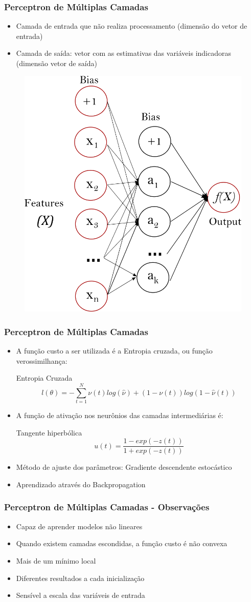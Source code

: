 \documentclass{beamer}
\begin{document}
\begin{frame}
\frametitle{Perceptron de Múltiplas Camadas}
\begin{itemize}
  \item Camada de entrada que não realiza processamento (dimensão do vetor de entrada)
  \item Camada de saída: vetor com as estimativas das variáveis indicadoras (dimensão vetor de saída)
\end{itemize}
\begin{figure}[H]
\centering
  \includegraphics[width=0.43\linewidth]{../img/multilayerperceptron_network.png}
  \label{fig:percep}
\end{figure}%
\end{frame}

\begin{frame}
\frametitle{Perceptron de Múltiplas Camadas}
\begin{itemize}
\item A função custo a ser utilizada é a Entropia cruzada, ou função verossimilhança:
\begin{block}{Entropia Cruzada}
\[ l(\theta) = -\sum_{t=1}^N \nu(t)log(\hat{\nu}) + (1-\nu(t)) log(1-\hat{\nu}(t)) \]
\end{block}
\item A função de ativação nos neurônios das camadas intermediárias é:
\begin{block}{Tangente hiperbólica}
\[ u(t) = \frac{1- exp(-z(t))}{1+exp(-z(t))}\]
\end{block}
\item Método de ajuste dos parâmetros: Gradiente descendente estocástico
\item Aprendizado através do Backpropagation
\end{itemize}
\end{frame}


\begin{frame}
\frametitle{Perceptron de Múltiplas Camadas - Observações}
\begin{itemize}
  \item Capaz de aprender modelos não lineares
  \item Quando existem camadas escondidas, a função custo é não convexa 
  \item Mais de um mínimo local
  \item Diferentes resultados a cada inicialização
  \item Sensível a escala das variáveis de entrada
\end{itemize}
\end{frame}
\end{document}
